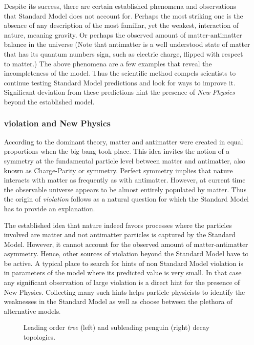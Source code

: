 Despite its success, there are certain established phenomena and observations that Standard
Model does not account for. Perhaps the most striking one is the absence of any description
of the most familiar, yet the weakest, interaction of nature, meaning gravity. Or perhaps the
observed amount of matter-antimatter balance in the universe \cite{more-cpv-huet,more-cpv-gavela_I,more-cpv-gavela_II}
(Note that antimatter is a well understood state of matter that has its quantum numbers sign,
such as electric charge, flipped with respect to matter.) The above phenomena are a few
examples that reveal the incompleteness of the model. Thus the scientific method compels
scientists to continue testing Standard Model predictions and look for ways to improve it.
Significant deviation from these predictions hint the presence of {\it New Physics}
beyond the established model.

\subsubsection{\CP violation and New Physics}
According to the dominant theory, matter and antimatter were created in equal proportions
when the big bang took place. This idea invites the notion of a
symmetry at the fundamental particle level between matter and antimatter, also known as
Charge-Parity or \CP symmetry. Perfect \CP symmetry implies that nature interacts with
matter as frequently as with antimatter. However, at current time the observable universe
appears to be almost entirely populated by matter. Thus the origin of {\it \CP  violation}
follows as a natural question for which the Standard Model has to provide an explanation.

The established idea that nature indeed favors processes where the particles involved
are matter and not antimatter particles is captured by the Standard Model.
However, it cannot account for the observed amount of matter-antimatter asymmetry.
Hence, other sources of \CP violation beyond the Standard Model have to be active.
A typical place to search for hints of non Standard Model \CP violation is in parameters
of the model where its predicted value is very small. In that case any significant observation
of large \CP violation is a direct hint for the presence of New Physics.
Collecting many such hints helps particle physicists to identify the weaknesses in the
Standard Model as well as choose between the plethora of alternative models.


\begin{figure}[t]
  \begin{subfigure}{0.5\textwidth}
    \raggedright
    {\scalebox{1}{\sffamily }}
    \caption{}
    \label{app_jpsiphi_tree}
  \end{subfigure}%
  \hfill
  \begin{subfigure}{0.5\textwidth}
    \raggedleft
    {\scalebox{1}{\sffamily }}
    \caption{}
    \label{app_jpsiphi_peng}
  \end{subfigure}
    \caption{Leading order {\it tree} (left) and subleading penguin (right) \BsJpsiPhi decay topologies.}
  \label{app_jpsiphi_tree_peng}
\end{figure}


